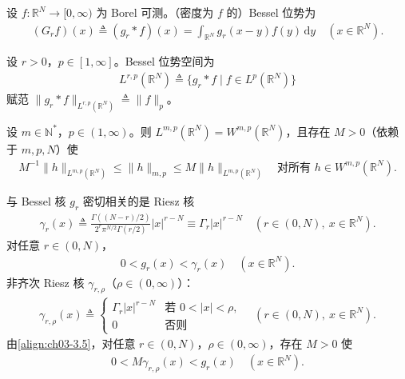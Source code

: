 \documentclass[../../main.tex]{subfiles}%
\begin{document}
设 $f:\mathbb{R}^N\to[0,\infty)$ 为 Borel 可测。（密度为 $f$ 的）Bessel 位势为
\begin{align}
(G_rf)(x)\triangleq (g_r*f)(x)=\int_{\mathbb{R}^N}g_r(x-y)f(y)\,\mathrm{d}y
\quad (x\in\mathbb{R}^N).\label{align:ch03-3.7}
\end{align}

设 $r>0$，$p\in[1,\infty]$。Bessel 位势空间为
\begin{align*}
L^{r,p}(\mathbb{R}^N)\triangleq \{g_r*f\mid f\in L^p(\mathbb{R}^N)\}
\end{align*}
赋范 $\|g_r*f\|_{L^{r,p}(\mathbb{R}^N)}\triangleq \|f\|_p$。

\begin{theorem}[Calder\'on]\label{theorem:ch03-Calderon}
设 $m\in\mathbb{N}^*$，$p\in(1,\infty)$。则 $L^{m,p}(\mathbb{R}^N)=W^{m,p}(\mathbb{R}^N)$，且存在 $M>0$（依赖于 $m,p,N$）使
\begin{align}
M^{-1}\|h\|_{L^{m,p}(\mathbb{R}^N)}\leqslant\|h\|_{m,p}\leqslant M\|h\|_{L^{m,p}(\mathbb{R}^N)}
\quad \text{对所有 }h\in W^{m,p}(\mathbb{R}^N).\label{align:ch03-3.8}
\end{align}
\end{theorem}

\begin{remark}\label{remark:ch03-Riesz核}
与 Bessel 核 $g_r$ 密切相关的是 Riesz 核
\begin{align}
\gamma_r(x)\triangleq \frac{\Gamma((N-r)/2)}{2^r\pi^{N/2}\Gamma(r/2)}|x|^{r-N}
\equiv\Gamma_r|x|^{r-N}
\quad (r\in(0,N),\ x\in\mathbb{R}^N).\label{align:ch03-3.9}
\end{align}
对任意 $r\in(0,N)$，
\begin{align}
0<g_r(x)<\gamma_r(x)\quad (x\in\mathbb{R}^N).\label{align:ch03-3.10}
\end{align}
非齐次 Riesz 核 $\gamma_{r,\rho}$（$\rho\in(0,\infty)$）：
\begin{align}
\gamma_{r,\rho}(x)\triangleq \begin{cases}
\Gamma_r|x|^{r-N} & \text{若 }0<|x|<\rho,\\
0 & \text{否则}
\end{cases}\quad (r\in(0,N),\ x\in\mathbb{R}^N).\label{align:ch03-3.11}
\end{align}
由\eqref{align:ch03-3.5}，对任意 $r\in(0,N)$，$\rho\in(0,\infty)$，存在 $M>0$ 使
\begin{align}
0<M\gamma_{r,\rho}(x)<g_r(x)\quad (x\in\mathbb{R}^N).\label{align:ch03-3.12}
\end{align}
\end{remark}
\end{document}
